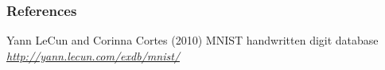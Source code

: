 

\begin{vbframe}
\frametitle{References}
\footnotesize{
\begin{thebibliography}{99}

 Yann LeCun and Corinna Cortes (2010)
\newblock MNIST handwritten digit database
\newblock \emph{\url{http://yann.lecun.com/exdb/mnist/}}
\end{thebibliography}
}
\end{vbframe}

\endlecture
